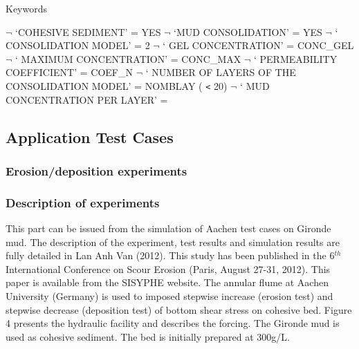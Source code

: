 Keywords

$\neg$\hspace{5mm} `COHESIVE SEDIMENT' = YES\newline
$\neg$\hspace{5mm} `MUD CONSOLIDATION' = YES\newline
$\neg$\hspace{5mm} ` CONSOLIDATION MODEL' = 2\newline
$\neg$\hspace{5mm} ` GEL CONCENTRATION' = CONC\_GEL\newline
$\neg$\hspace{5mm} ` MAXIMUM CONCENTRATION' = CONC\_MAX\newline
$\neg$\hspace{5mm} ` PERMEABILITY COEFFICIENT' = COEF\_N\newline
$\neg$\hspace{5mm} ` NUMBER OF LAYERS OF THE CONSOLIDATION MODEL' = NOMBLAY (%
\texttt{<} 20)\newline
$\neg$\hspace{5mm} ` MUD CONCENTRATION PER LAYER' =

\newpage

\subsection{Application Test Cases}

\subsubsection{Erosion/deposition experiments}

\subsubsection*{Description of experiments}

This part can be issued from the simulation of Aachen test cases on Gironde
mud. The description of the experiment, test results and simulation results
are fully detailed in Lan Anh Van (2012). This study has been published in
the 6$^{th}$ International Conference on Scour Erosion (Paris, August 27-31,
2012). This paper is available from the SISYPHE website.\newline
The annular flume at Aachen University (Germany) is used to imposed stepwise
increase (erosion test) and stepwise decrease (deposition test) of bottom
shear stress on cohesive bed. Figure 4 presents the hydraulic facility and
describes the forcing. The Gironde mud is used as cohesive sediment. The bed
is initially prepared at 300g/L. \newline


